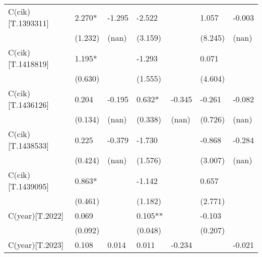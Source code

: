 \begin{table}
\begin{center}
\begin{tabular}{lllllll}
C(cik)[T.1393311] & 2.270*             & -1.295             & -2.522               &                      & 1.057                & -0.003                         \\
                  & (1.232)            & (nan)              & (3.159)              &                      & (8.245)              & (nan)                          \\
C(cik)[T.1418819] & 1.195*             &                    & -1.293               &                      & 0.071                &                                \\
                  & (0.630)            &                    & (1.555)              &                      & (4.604)              &                                \\
C(cik)[T.1436126] & 0.204              & -0.195             & 0.632*               & -0.345               & -0.261               & -0.082                         \\
                  & (0.134)            & (nan)              & (0.338)              & (nan)                & (0.726)              & (nan)                          \\
C(cik)[T.1438533] & 0.225              & -0.379             & -1.730               &                      & -0.868               & -0.284                         \\
                  & (0.424)            & (nan)              & (1.576)              &                      & (3.007)              & (nan)                          \\
C(cik)[T.1439095] & 0.863*             &                    & -1.142               &                      & 0.657                &                                \\
                  & (0.461)            &                    & (1.182)              &                      & (2.771)              &                                \\
C(year)[T.2022]   & 0.069              &                    & 0.105**              &                      & -0.103               &                                \\
                  & (0.092)            &                    & (0.048)              &                      & (0.207)              &                                \\
C(year)[T.2023]   & 0.108              & 0.014              & 0.011                & -0.234               &                      & -0.021                         \\

\end{tabular}
\end{center}
\end{table}
